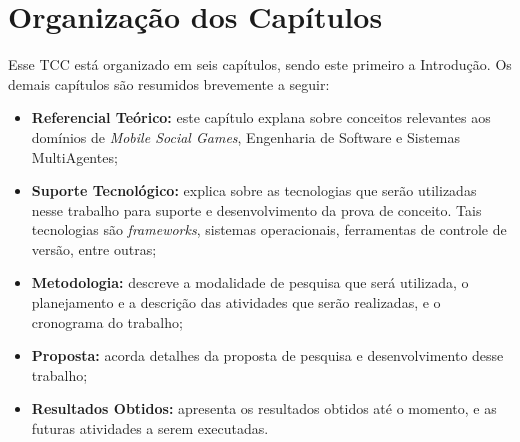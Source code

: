 \section{Organização dos Capítulos}

Esse TCC está organizado em seis capítulos, sendo este primeiro a Introdução. Os demais capítulos são resumidos brevemente a seguir:

  \begin{itemize}
    \item \textbf{Referencial Teórico:} este capítulo explana sobre conceitos relevantes aos domínios de \textit{Mobile Social Games}, Engenharia de Software e Sistemas MultiAgentes;
    \item \textbf{Suporte Tecnológico:} explica sobre as tecnologias que serão utilizadas nesse trabalho para suporte e desenvolvimento da prova de conceito. Tais tecnologias são \textit{frameworks}, sistemas operacionais, ferramentas de controle de versão, entre outras;
    \item \textbf{Metodologia:} descreve a modalidade de pesquisa que será utilizada, o planejamento e a descrição das atividades que serão realizadas, e o cronograma do trabalho;
    \item \textbf{Proposta:} acorda detalhes da proposta de pesquisa e desenvolvimento desse trabalho;
    \item \textbf{Resultados Obtidos:} apresenta os resultados obtidos até o momento, e as futuras atividades a serem executadas.
  \end{itemize}
